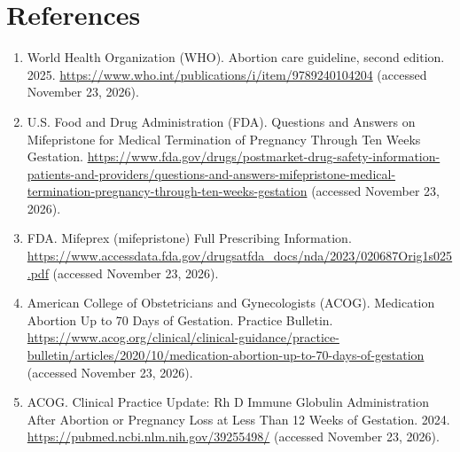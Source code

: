 \section*{References}
\begin{enumerate}
  \item World Health Organization (WHO). Abortion care guideline, second edition. 2025. \url{https://www.who.int/publications/i/item/9789240104204} (accessed November 23, 2026).
  \item U.S. Food and Drug Administration (FDA). Questions and Answers on Mifepristone for Medical Termination of Pregnancy Through Ten Weeks Gestation. \url{https://www.fda.gov/drugs/postmarket-drug-safety-information-patients-and-providers/questions-and-answers-mifepristone-medical-termination-pregnancy-through-ten-weeks-gestation} (accessed November 23, 2026).
  \item FDA. Mifeprex (mifepristone) Full Prescribing Information. \url{https://www.accessdata.fda.gov/drugsatfda_docs/nda/2023/020687Orig1s025.pdf} (accessed November 23, 2026).
  \item American College of Obstetricians and Gynecologists (ACOG). Medication Abortion Up to 70 Days of Gestation. Practice Bulletin. \url{https://www.acog.org/clinical/clinical-guidance/practice-bulletin/articles/2020/10/medication-abortion-up-to-70-days-of-gestation} (accessed November 23, 2026).
  \item ACOG. Clinical Practice Update: Rh D Immune Globulin Administration After Abortion or Pregnancy Loss at Less Than 12 Weeks of Gestation. 2024. \url{https://pubmed.ncbi.nlm.nih.gov/39255498/} (accessed November 23, 2026).
\end{enumerate}

\clearpage
